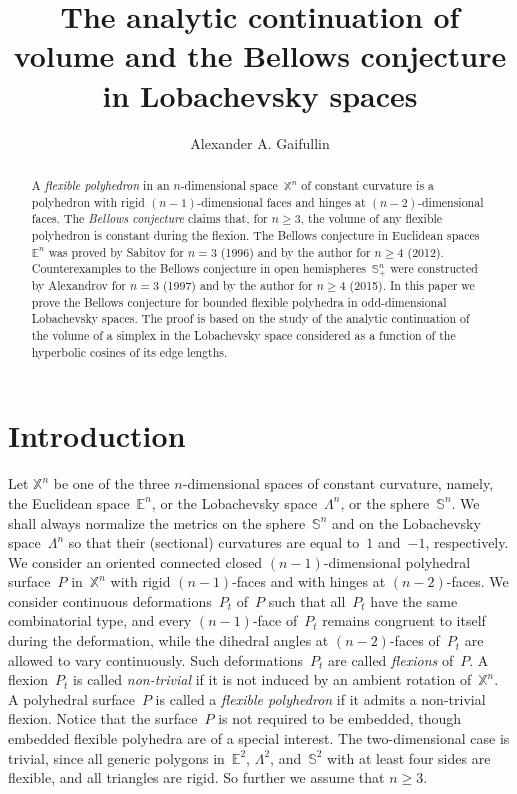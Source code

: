 \documentclass[reqno,tbtags,12pt]{amsart}
\author{Alexander A. Gaifullin}
\title[The Bellows conjecture in Lobachevsky spaces]{The analytic continuation of volume and the Bellows conjecture in Lobachevsky spaces}
\date{}
\numberwithin{equation}{section}
\newcommand{\E}{\mathbb{E}}
\newcommand{\X}{\mathbb{X}}
\newcommand{\bS}{\mathbb{S}}
\theoremstyle{definition}
\begin{document}
\begin{abstract}
A \textit{flexible polyhedron} in an $n$-dimensional space~$\X^n$ of constant curvature is a polyhedron with rigid $(n-1)$-dimensional faces and hinges at $(n-2)$-dimensional faces. The \textit{Bellows conjecture} claims that, for $n\ge 3$, the volume of any flexible polyhedron is constant during the flexion. The Bellows conjecture in Euclidean spaces~$\E^n$ was proved by Sabitov for $n=3$ (1996) and by the author for $n\ge 4$ (2012). Counterexamples to the Bellows conjecture in open hemispheres~$\bS^n_+$ were constructed by Alexandrov for $n=3$ (1997) and by the author for $n\ge 4$ (2015). In this paper we prove the Bellows conjecture for bounded flexible polyhedra in odd-dimensional Lobachevsky spaces. The proof is based on the study of the analytic continuation of the volume of a simplex in the Lobachevsky space considered as a function of the hyperbolic cosines of its edge lengths.
\end{abstract}



\maketitle

\section{Introduction}

Let $\X^n$ be one of the three $n$-dimensional spaces of constant curvature, namely, the Euclidean space~$\E^n$, or the Lobachevsky space~$\Lambda^n$, or the sphere~$\bS^n$. We shall always normalize the metrics on the sphere~$\bS^n$ and on the Lobachevsky space~$\Lambda^n$ so that their (sectional) curvatures are equal to~$1$ and~$-1$, respectively. We consider an oriented connected closed  $(n-1)$-dimensional polyhedral surface~$P$ in~$\X^n$ with rigid $(n-1)$-faces and with hinges at $(n-2)$-faces. We consider continuous deformations~$P_t$ of~$P$ such that all~$P_t$ have the same combinatorial type, and every $(n-1)$-face of~$P_t$ remains congruent to itself during the deformation, while the dihedral angles at $(n-2)$-faces of~$P_t$ are allowed to vary continuously. Such deformations~$P_t$ are called \textit{flexions\/} of~$P$. A flexion~$P_t$ is called \textit{non-trivial} if it is not induced by an ambient rotation of~$\X^n$. A polyhedral surface~$P$ is called a \textit{flexible polyhedron\/} if it admits a non-trivial flexion. Notice that the surface~$P$ is not required to be embedded, though embedded flexible polyhedra are  of  a special interest. The two-dimensional case is trivial, since all generic polygons in~$\E^2$, $\Lambda^2$, and~$\bS^2$ with at least four sides are flexible, and all triangles are rigid. So further we assume that $n\ge 3$. 
\end{document}
